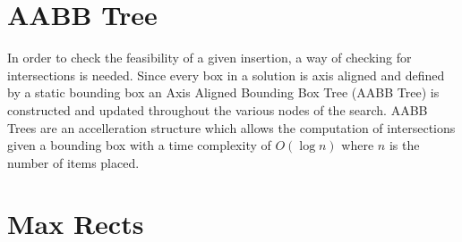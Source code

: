 

\section{AABB Tree}\label{chapter:heuristics:aabbtree}

In order to check the feasibility of a given insertion,
a way of checking for intersections is needed.
Since every box in a solution is axis aligned and defined by a static bounding box an Axis Aligned Bounding Box Tree (AABB Tree) is constructed and updated throughout the various nodes of the search.
AABB Trees are an accelleration structure which allows the computation of intersections given a bounding box with a time complexity of $O(\log{n})$ where $n$ is the number of items placed.

\section{Max Rects}\label{chapter:heuristics:maxrects}